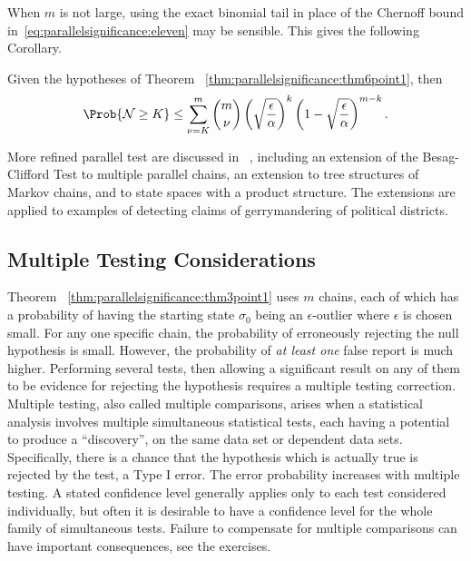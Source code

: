 \documentclass[12pt]{article}
\begin{document}
\begin{remark}
    When \( m \) is not large, using the exact binomial tail in place of
    the Chernoff bound in~\eqref{eq:parallelsignificance:eleven} may be
    sensible.  This gives the following Corollary.
\end{remark}

\begin{corollary}
    Given the hypotheses of Theorem~%
    \ref{thm:parallelsignificance:thm6point1}, then
    \[
        \Prob{\mathcal{N} \ge K} \le \sum\limits_ {\nu=K}^m \binom{m}{\nu}
        \left( \sqrt{\frac{\epsilon} {\alpha}} \right)^k \left( 1 -
        \sqrt{\frac {\epsilon}{\alpha}} \right)^ {m-k}.
    \]
\end{corollary}

More refined parallel test are discussed in~%
\cite{doi:10.1080/2330443X.2020.1806763}, including an extension of the
Besag-Clifford Test to multiple parallel chains, an extension to tree
structures of Markov chains, and to state spaces with a product
structure.  The extensions are applied to examples of detecting claims
of gerrymandering of political districts.

\subsection*{Multiple Testing Considerations}

Theorem~%
\ref{thm:parallelsignificance:thm3point1} uses \( m \) chains, each of
which has a probability of having the starting state \( \sigma_0 \)
being an \( \epsilon \)-outlier where \( \epsilon \) is chosen small.
For any one specific chain, the probability of erroneously rejecting the
null hypothesis is small.  However, the probability of \emph{at least
one} false report is much higher.  Performing several tests, then
allowing a significant result on any of them to be evidence for
rejecting the hypothesis requires a multiple testing correction.
Multiple testing,%
also called multiple comparisons, arises when a statistical analysis
involves multiple simultaneous statistical tests, each having a
potential to produce a ``discovery'', on the same data set or dependent
data sets.  Specifically, there is a chance that the hypothesis which is
actually true is rejected by the test, a Type I error.  The error
probability increases with multiple testing.  A stated confidence level
generally applies only to each test considered individually, but often
it is desirable to have a confidence level for the whole family of
simultaneous tests.  Failure to compensate for multiple comparisons can
have important consequences, see the exercises.
\end{document}

